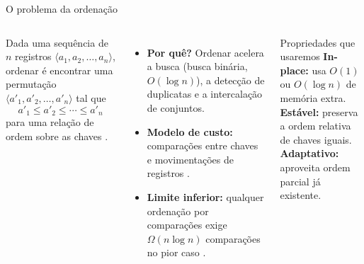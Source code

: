 \documentclass[aspectratio=169,10pt]{beamer}
\begin{document}
\begin{frame}{O problema da ordenação}
 \begin{columns}[T]
   \small Dada uma sequência de $n$ registros $\langle a_1,a_2,\dots,a_n\rangle$, ordenar é encontrar uma permutação
   $\langle a'_1,a'_2,\dots,a'_n\rangle$ tal que
   \[ a'_1\le a'_2\le\cdots\le a'_n \]
   para uma relação de ordem sobre as chaves \cite{knuth98,clrs22}.
   \vspace{0.3em}
   \footnotesize
   \begin{itemize}
    \item \textbf{Por quê?} Ordenar acelera a busca (busca binária, $O(\log n)$), a detecção de duplicatas e a intercalação de conjuntos.
    \item \textbf{Modelo de custo:} comparações entre chaves e movimentações de registros \cite{knuth98}.
    \item \textbf{Limite inferior:} qualquer ordenação por comparações exige $\Omega(n\log n)$ comparações no pior caso \cite{clrs22}.
   \end{itemize}
   \begin{exampleblock}{Propriedades que usaremos}
    \footnotesize
    \textbf{In-place:} usa $O(1)$ ou $O(\log n)$ de memória extra.\\[0.3ex]
    \textbf{Estável:} preserva a ordem relativa de chaves iguais.\\[0.3ex]
    \textbf{Adaptativo:} aproveita ordem parcial já existente.
   \end{exampleblock}
 \end{columns}
\end{frame}
\end{document}
